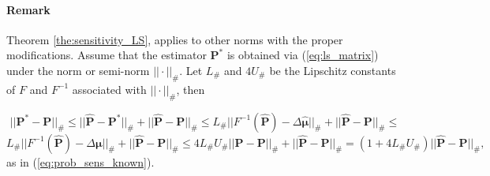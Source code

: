 \documentclass[twoside,11pt]{article}
\begin{document}
\paragraph{Remark} Theorem \ref{the:sensitivity_LS}, applies to other norms with the proper modifications. Assume that the estimator $\boldsymbol{P}^*$ is obtained via (\ref{eq:ls_matrix}) under the norm or semi-norm $||\cdot||_{\#}$. Let $L_{\#}$ and $4U_{\#}$ be the Lipschitz constants of $F$ and $F^{-1}$ associated with $||\cdot||_{\#}$, then 
    
$$||\boldsymbol{P^*} - \boldsymbol{P}||_{\#} \leq ||\boldsymbol{\hat P} - \boldsymbol{P^*}||_{\#}+||\boldsymbol{\hat P} - \boldsymbol{P}||_{\#} \leq L_{\#} ||F^{-1}(\boldsymbol{\hat P}) - \Delta \boldsymbol{\hat{\mu}}||_{\#}+||\boldsymbol{\hat P} - \boldsymbol{P}||_{\#}  \leq$$ $$  L_{\#} ||F^{-1}(\boldsymbol{\hat P}) - \Delta \boldsymbol{\mu}||_{\#}+||\boldsymbol{\hat P} - \boldsymbol{P}||_{\#}\leq 4L_{\#}U_{\#}||\boldsymbol{\hat P} - \boldsymbol{P}||_{\#}+ ||\boldsymbol{\hat P} - \boldsymbol{P}||_{\#} = (1+4L_{\#}U_{\#})||\hat{\boldsymbol{P}} - \boldsymbol{P}||_{\#},$$
as in (\ref{eq:prob_sens_known}). 
%
\end{document}
